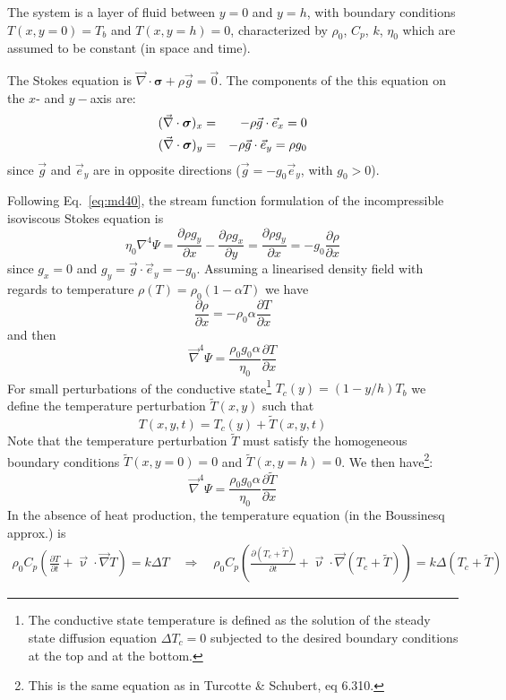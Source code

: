 
The system is a layer of fluid between $y=0$ and $y=h$, with boundary conditions $T(x,y=0)=T_b$ 
and $T(x,y=h)=0$, characterized by $\rho_0$, $C_p$, $k$, $\eta_0$ which are assumed to be constant
(in space and time). 


The Stokes equation is $\vec \nabla \cdot \bm \sigma + \rho \vec g = \vec 0$. 
The components of the this equation on the $x$- and $y-$axis are:
\begin{eqnarray}
(\vec \nabla \cdot \bm \sigma)_x &=& - \rho \vec g \cdot \vec e_x = 0 \nonumber\\ 
(\vec \nabla \cdot \bm \sigma)_y &=& - \rho \vec g \cdot \vec e_y = \rho g_0 \nonumber
\end{eqnarray}
since $\vec g$ and $\vec e_y$ are in opposite directions ($\vec g = - g_0 \vec e_y$, with $g_0>0$).

Following Eq.~\eqref{eq:md40}, the stream function formulation of the incompressible 
isoviscous Stokes equation is
\[
\eta_0 \nabla^4 \Psi
= \frac{\partial \rho g_y}{\partial x} - \frac{\partial \rho g_x}{\partial y}   
= \frac{\partial \rho g_y}{\partial x} 
= -g_0 \frac{\partial \rho}{\partial x} 
\]
since $g_x=0$ and $g_y=\vec{g}\cdot\vec{e}_y=-g_0$.
Assuming a linearised density field with regards to temperature $\rho(T)=\rho_0 (1-\alpha T)$
we have 
\[
\frac{\partial \rho}{\partial x} 
=
-\rho_0 \alpha \frac{\partial T}{\partial x} 
\]
and then 
\begin{equation}
\vec\nabla^4 \Psi= \frac{\rho_0 g_0 \alpha}{\eta_0} \frac{\partial T}{\partial x} 
\end{equation}
For small perturbations of the conductive state\footnote{The conductive state temperature
is defined as the solution of the steady state diffusion equation $\Delta T_c = 0$ 
subjected to the desired boundary conditions at the top and at the bottom.} $T_c(y)=(1-y/h)T_b$ 
we define the temperature perturbation $\tilde{T}(x,y)$ such that 
\[
T(x,y,t)=T_c(y)+\tilde{T}(x,y,t)
\]
Note that the temperature perturbation $\tilde{T}$ must satisfy the homogeneous boundary 
conditions $\tilde{T}(x,y=0)=0$ and $\tilde{T}(x,y=h)=0$.
We then have\footnote{This is the same equation as in Turcotte \& Schubert, eq 6.310.}: 
\begin{equation}
\boxed{
\vec\nabla^4 \Psi= \frac{\rho_0 g_0 \alpha}{\eta_0} \frac{\partial \tilde{T}}{\partial x} 
}
\label{eq:biharm3}
\end{equation}
In the absence of heat production, the temperature equation (in the Boussinesq approx.) is 
\begin{eqnarray}
 \rho_0 C_p \left( \frac{\partial T}{\partial t} + {\vec \upnu}\cdot {\vec \nabla} T \right) 
= k \Delta T 
\quad
\Rightarrow
\quad
\rho_0 C_p \left( \frac{\partial (T_c+\tilde{T})}{\partial t} + {\vec \upnu}\cdot {\vec \nabla} 
(T_c+\tilde{T}) \right) 
= k \Delta (T_c+\tilde{T})
\end{eqnarray}
